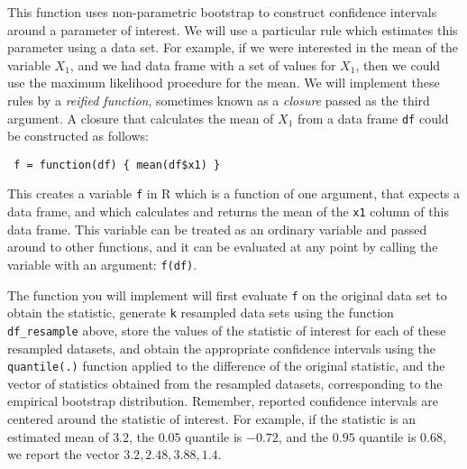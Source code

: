 \documentclass[11pt]{article}
\begin{document}
This function uses non-parametric bootstrap to construct confidence intervals around a parameter of interest.  We will use a particular rule which estimates this parameter using a data set.  For example, if we were interested in the mean of the variable $X_1$, and we had data frame with a set of values for $X_1$, then we could use the maximum likelihood procedure for the mean.  We will implement these rules by a \emph{reified function}, sometimes known as a \emph{closure} passed as the third argument.  A closure that calculates the mean of $X_1$ from a data frame \texttt{df} could be constructed as follows:
\begin{center}
\texttt{ f = function(df) \{ mean(df\$x1) \}}
\end{center}
This creates a variable \texttt{f} in R which is a function of one argument, that expects a data frame, and which calculates and returns the mean of the \texttt{x1} column of this data frame.  This variable can be treated as an ordinary variable and passed around to other functions, and it can be evaluated at any point by calling the variable with an argument: \texttt{f(df)}.

The function you will implement will first evaluate \texttt{f} on the original data set to obtain the statistic, generate \texttt{k} resampled data sets using the function \texttt{df\_resample} above, store the values of the statistic of interest for each of these resampled datasets, and obtain the appropriate  confidence intervals using the \texttt{quantile(.)} function applied to the difference of the original statistic, and the vector of statistics obtained from the resampled datasets, corresponding to the empirical bootstrap distribution.  Remember, reported confidence intervals are centered around the statistic of interest.  For example, if the statistic is an estimated mean of $3.2$, the $0.05$ quantile is $-0.72$, and the $0.95$ quantile is $0.68$, we report the vector $3.2, 2.48, 3.88, 1.4$.
\end{document}
